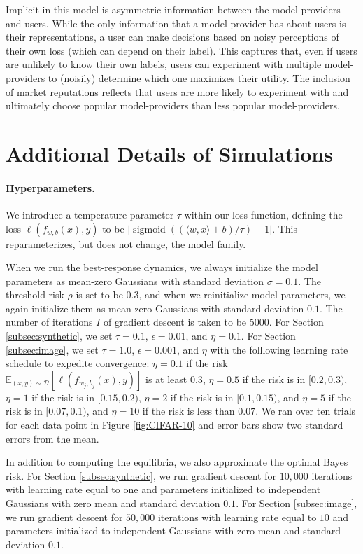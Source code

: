 \documentclass[letterpaper,11pt]{article}
\theoremstyle{plain}
\DeclareMathOperator*{\sigmoid}{sigmoid}
\begin{document}
Implicit in this model is asymmetric information between the model-providers and users. While the only information that a model-provider has about users is their representations, a user can make decisions based on noisy perceptions of their own loss (which can depend on their label). This captures that, even if users are unlikely to know their own labels,  users can experiment with multiple model-providers to (noisily) determine which one maximizes their utility. The inclusion of market reputations reflects that users are more likely to experiment with and ultimately choose popular model-providers than less popular model-providers. 


\section{Additional Details of Simulations }\label{appendix:setup}

\paragraph{Hyperparameters. } We introduce a temperature parameter $\tau$ within our loss function, defining the loss $\ell(f_{w,b}(x), y)$ to be $|\sigmoid((\langle w, x \rangle + b)/\tau) - 1|$. This reparameterizes, but does not change, the model family. 

When we run the best-response dynamics, we always initialize the model parameters as mean-zero Gaussians with standard deviation $\sigma = 0.1$. The threshold risk $\rho$ is set to be $0.3$, and when we reinitialize model parameters, we again initialize them as mean-zero Gaussians with standard deviation $0.1$. The number of iterations $I$ of gradient descent is taken to be 5000. For Section \ref{subsec:synthetic}, we set $\tau = 0.1$, $\epsilon = 0.01$, and $\eta = 0.1$. For Section \ref{subsec:image}, we set $\tau = 1.0$, $\epsilon = 0.001$, and $\eta$ with the folllowing learning rate schedule to expedite convergence: $\eta = 0.1$ if the risk $\mathbb{E}_{(x,y) \sim \mathcal{D}}[\ell(f_{w_j, b_j}(x), y)]$ is at least $0.3$, $\eta = 0.5$ if the risk is in $[0.2, 0.3)$, $\eta = 1$ if the risk is in $[0.15, 0.2)$, $\eta = 2$ if the risk is in $[0.1, 0.15)$, and $\eta = 5$ if the risk is in $[0.07, 0.1)$, and $\eta = 10$ if the risk is less than $0.07$. We ran over ten trials for each data point in Figure \ref{fig:CIFAR-10} and error bars show two standard errors from the mean. 

In addition to computing the equilibria, we also approximate the optimal Bayes risk. For Section \ref{subsec:synthetic}, we run gradient descent for $10,000$ iterations with learning rate equal to one and parameters initialized to independent Gaussians with zero mean and standard deviation $0.1$. For Section \ref{subsec:image}, we run gradient descent for $50,000$ iterations with learning rate equal to $10$ and parameters initialized to independent Gaussians with zero mean and standard deviation $0.1$. 
\end{document}
